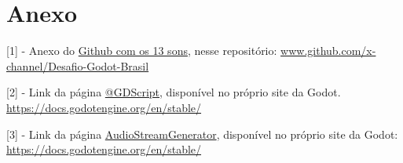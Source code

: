 \documentclass{scrartcl}
\begin{document}
\section{Anexo}
[1] - Anexo do \href{https://github.com/x-channel/Desafio-Godot-Brasil/upload/main/Anexos/Samples}{Github com os 13 sons}, nesse repositório: \url{www.github.com/x-channel/Desafio-Godot-Brasil}

[2] - Link da página \href{https://docs.godotengine.org/en/stable/getting_started/scripting/gdscript/gdscript_basics.html}{@GDScript}, disponível no próprio site da Godot. \url{https://docs.godotengine.org/en/stable/}

[3] - Link da página \href{https://docs.godotengine.org/en/stable/classes/class_audiostreamgenerator.html}{AudioStreamGenerator}, disponível no próprio site da Godot: \url{https://docs.godotengine.org/en/stable/}
\end{document}

